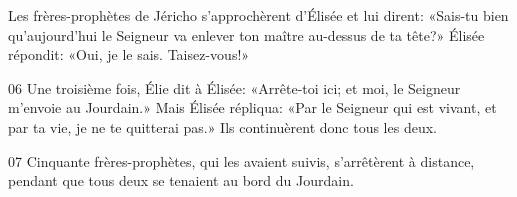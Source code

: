 Les frères-prophètes de Jéricho s’approchèrent d’Élisée et lui dirent: «Sais-tu bien qu’aujourd’hui le Seigneur va enlever ton maître au-dessus de ta tête?» Élisée répondit: «Oui, je le sais. Taisez-vous!»

06 Une troisième fois, Élie dit à Élisée: «Arrête-toi ici; et moi, le Seigneur m’envoie au Jourdain.» Mais Élisée répliqua: «Par le Seigneur qui est vivant, et par ta vie, je ne te quitterai pas.» Ils continuèrent donc tous les deux.

07 Cinquante frères-prophètes, qui les avaient suivis, s’arrêtèrent à distance, pendant que tous deux se tenaient au bord du Jourdain.
